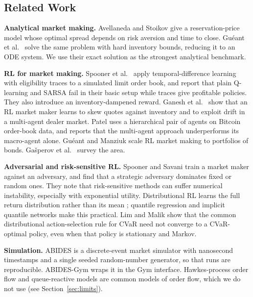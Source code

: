\documentclass[10pt,twocolumn]{article}
\begin{document}
\subsection{Related Work}
\textbf{Analytical market making.} Avellaneda and Stoikov \citep{avellaneda2008} give a reservation-price model whose optimal spread depends on risk aversion and time to close. Gu\'eant et al.\ \citep{gueant2012} solve the same problem with hard inventory bounds, reducing it to an ODE system. We use their exact solution as the strongest analytical benchmark.

\textbf{RL for market making.} Spooner et al.\ \citep{spooner2018} apply temporal-difference learning with eligibility traces to a simulated limit order book, and report that plain Q-learning and SARSA fail in their basic setup while traces give profitable policies. They also introduce an inventory-dampened reward. Ganesh et al.\ \citep{ganesh2019} show that an RL market maker learns to skew quotes against inventory and to exploit drift in a multi-agent dealer market. Patel \citep{patel2018} uses a hierarchical pair of agents on Bitcoin order-book data, and reports that the multi-agent approach underperforms its macro-agent alone. Gu\'eant and Manziuk \citep{gueant2019} scale RL market making to portfolios of bonds. Ga\v{s}perov et al.\ \citep{gasperov2021survey} survey the area.

\textbf{Adversarial and risk-sensitive RL.} Spooner and Savani \citep{spooner2020} train a market maker against an adversary, and find that a strategic adversary dominates fixed or random ones. They note that risk-sensitive methods can suffer numerical instability, especially with exponential utility. Distributional RL learns the full return distribution rather than its mean \citep{bellemare2017}; quantile regression \citep{dabney2018qr} and implicit quantile networks \citep{dabney2018iqn} make this practical. Lim and Malik \citep{lim2022} show that the common distributional action-selection rule for CVaR need not converge to a CVaR-optimal policy, even when that policy is stationary and Markov.

\textbf{Simulation.} ABIDES \citep{byrd2019} is a discrete-event market simulator with nanosecond timestamps and a single seeded random-number generator, so that runs are reproducible. ABIDES-Gym \citep{amrouni2021} wraps it in the Gym interface. Hawkes-process order flow \citep{bacry2015} and queue-reactive models \citep{huang2015} are common models of order flow, which we do not use (see Section~\ref{sec:limits}).
\end{document}
